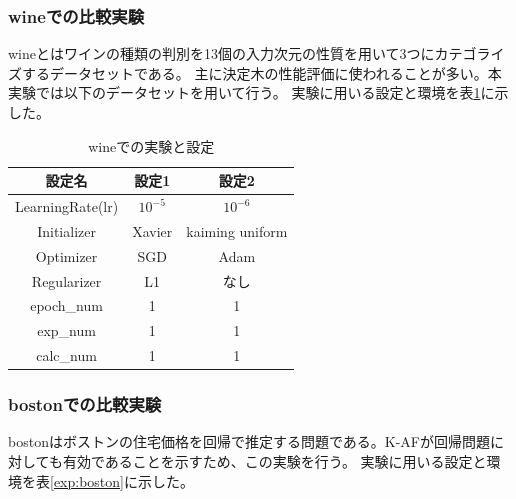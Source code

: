 \subsubsection{wineでの比較実験}
\label{impl:wine}

wineとはワインの種類の判別を13個の入力次元の性質を用いて3つにカテゴライズするデータセットである。
主に決定木の性能評価に使われることが多い。本実験では以下のデータセットを用いて行う。
実験に用いる設定と環境を表\ref{exp:wine}に示した。


\begin{table}[htbp]
    \begin{center}
        \caption{wineでの実験と設定}
        \label{exp:wine}
        \vspace{2mm} 
        \begin{tabular}{ |c|c|c| }
        設定名 & 設定1 & 設定2 \\
        \hline
        LearningRate(lr)         & $ 10^{-5} $ & $ 10^{-6} $ \\
        Initializer       & Xavier & kaiming uniform \\
        Optimizer           & SGD & Adam \\
        Regularizer     & L1 & なし \\
        epoch\_num       & 1 &  1 \\
        exp\_num         & 1 & 1 \\
        calc\_num        & 1 & 1 \\
        \end{tabular}
    \end{center}
\end{table}


\subsubsection{bostonでの比較実験}
\label{impl:boston}

bostonはボストンの住宅価格を回帰で推定する問題である。K-AFが回帰問題に対しても有効であることを示すため、この実験を行う。
実験に用いる設定と環境を表\ref{exp:boston}に示した。

